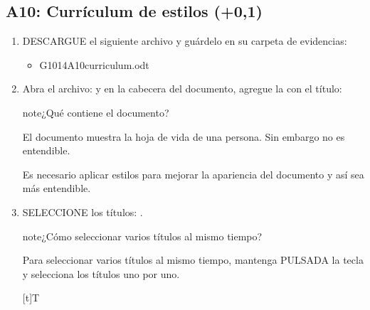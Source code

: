 \documentclass[letterpaper,10pt,spanish]{sphinxmanual}
\begin{document}
\subsection{A10: Currículum de estilos  (+0,1)}
\label{\detokenize{1_guias/10ofimatica/G1014:a10-curriculum-de-estilos-101-0-1}}\begin{enumerate}
%
\item {} 
\sphinxAtStartPar
DESCARGUE el siguiente archivo y guárdelo en su carpeta de evidencias:
\begin{itemize}
\item {} 
\sphinxAtStartPar
G1014A10\sphinxhyphen{}curriculum.odt 

\end{itemize}

\item {} 
\sphinxAtStartPar
Abra el archivo:  y en la cabecera del documento, agregue la  con el título: 

\begin{sphinxadmonition}{note}{¿Qué contiene el documento?}

\sphinxAtStartPar
El documento muestra la hoja de vida de una persona. Sin embargo no es entendible.

\sphinxAtStartPar
Es necesario aplicar estilos para mejorar la apariencia del documento y así sea más entendible.
\end{sphinxadmonition}

\item {} 
\sphinxAtStartPar
SELECCIONE los títulos: .

\begin{sphinxadmonition}{note}{¿Cómo seleccionar varios títulos al mismo tiempo?}

\sphinxAtStartPar
Para seleccionar varios títulos al mismo tiempo, mantenga PULSADA la tecla  y selecciona los títulos uno por uno.
\end{sphinxadmonition}


\begin{savenotes}\sphinxattablestart
\sphinxthistablewithglobalstyle
\centering
\begin{tabulary}{\linewidth}[t]{T}
\sphinxtoprule
\sphinxtableatstartofbodyhook


\end{tabulary}
\end{savenotes}
\end{enumerate}
\end{document}
